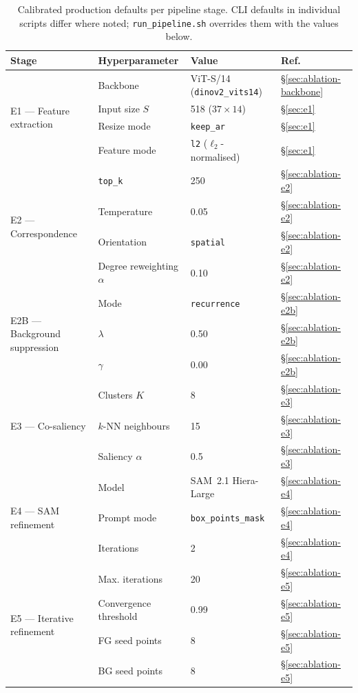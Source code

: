 \begin{table}[t]
\centering
\caption{Calibrated production defaults per pipeline stage. CLI defaults in individual scripts differ where noted; \texttt{run\_pipeline.sh} overrides them with the values below.}
\label{tab:production-defaults}
\begin{tabular}{@{}llll@{}}
\toprule
\textbf{Stage} & \textbf{Hyperparameter} & \textbf{Value} & \textbf{Ref.} \\
\midrule
\multirow{4}{*}{E1 --- Feature extraction}
  & Backbone            & ViT-S/14 (\texttt{dinov2\_vits14}) & \S\ref{sec:ablation-backbone} \\
  & Input size $S$      & 518 ($37\times14$)                 & \S\ref{sec:e1} \\
  & Resize mode         & \texttt{keep\_ar}                  & \S\ref{sec:e1} \\
  & Feature mode        & \texttt{l2} ($\ell_2$-normalised)  & \S\ref{sec:e1} \\
\midrule
\multirow{4}{*}{E2 --- Correspondence}
  & \texttt{top\_k}         & 250    & \S\ref{sec:ablation-e2} \\
  & Temperature          & 0.05   & \S\ref{sec:ablation-e2} \\
  & Orientation           & \texttt{spatial}   & \S\ref{sec:ablation-e2} \\
  & Degree reweighting $\alpha$ & 0.10 & \S\ref{sec:ablation-e2} \\
\midrule
\multirow{3}{*}{E2B --- Background suppression}
  & Mode                & \texttt{recurrence} & \S\ref{sec:ablation-e2b} \\
  & $\lambda$            & 0.50               & \S\ref{sec:ablation-e2b} \\
  & $\gamma$             & 0.00               & \S\ref{sec:ablation-e2b} \\
\midrule
\multirow{3}{*}{E3 --- Co-saliency}
  & Clusters $K$         & 8      & \S\ref{sec:ablation-e3} \\
  & $k$-NN neighbours    & 15     & \S\ref{sec:ablation-e3} \\
  & Saliency $\alpha$    & 0.5    & \S\ref{sec:ablation-e3} \\
\midrule
\multirow{3}{*}{E4 --- SAM refinement}
  & Model                & SAM~2.1 Hiera-Large & \S\ref{sec:ablation-e4} \\
  & Prompt mode          & \texttt{box\_points\_mask} & \S\ref{sec:ablation-e4} \\
  & Iterations           & 2      & \S\ref{sec:ablation-e4} \\
\midrule
\multirow{4}{*}{E5 --- Iterative refinement}
  & Max. iterations      & 20     & \S\ref{sec:ablation-e5} \\
  & Convergence threshold & 0.99  & \S\ref{sec:ablation-e5} \\
  & FG seed points       & 8      & \S\ref{sec:ablation-e5} \\
  & BG seed points       & 8      & \S\ref{sec:ablation-e5} \\
\bottomrule
\end{tabular}
\end{table}

